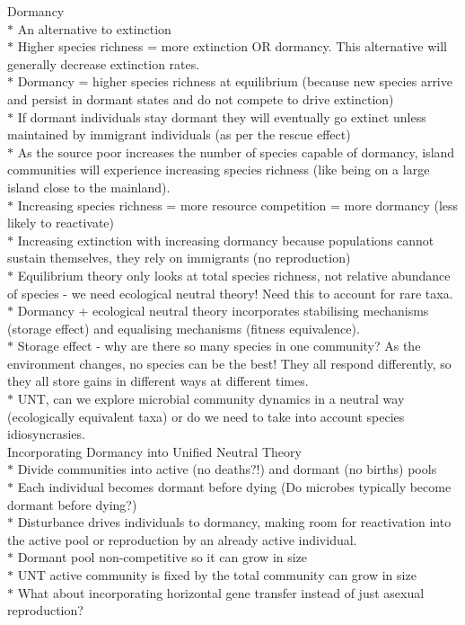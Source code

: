 \noindent Dormancy\\
{$\ast$ An alternative to extinction}\\
{$\ast$ Higher species richness = more extinction OR dormancy. This alternative will generally decrease extinction rates.}\\
{$\ast$ Dormancy = higher species richness at equilibrium (because new species arrive and persist in dormant states and do not compete to drive extinction)}\\
{$\ast$ If dormant individuals stay dormant they will eventually go extinct  unless maintained by immigrant individuals (as per the rescue effect)}\\
{$\ast$ As the source poor increases the number of species capable of dormancy, island communities will experience increasing species richness (like being on a large island close to the mainland).}\\
{$\ast$ Increasing species richness = more resource competition = more dormancy (less likely to reactivate)}\\
{$\ast$ Increasing extinction with increasing dormancy because populations cannot sustain themselves, they rely on immigrants (no reproduction)}\\
{$\ast$ Equilibrium theory only looks at total species richness, not relative abundance of species - we need ecological neutral theory! Need this to account for rare taxa. }\\
{$\ast$ Dormancy + ecological neutral theory incorporates stabilising mechanisms (storage effect) and equalising mechanisms (fitness equivalence).}\\
{$\ast$ Storage effect - why are there so many species in one community? As the environment changes, no species can be the best! They all respond differently, so they all store gains in different ways at different times.}\\
{$\ast$ UNT, can we explore microbial community dynamics in a neutral way (ecologically equivalent taxa) or do we need to take into account species idiosyncrasies. }\\

\noindent Incorporating Dormancy into Unified Neutral Theory\\
{$\ast$ Divide communities into active (no deaths?!) and dormant (no births) pools}\\
{$\ast$ Each individual becomes dormant before dying (Do microbes typically become dormant before dying?)}\\
{$\ast$ Disturbance drives individuals to dormancy, making room for reactivation into the active pool or reproduction by an already active individual. }\\
{$\ast$ Dormant pool non-competitive so it can grow in size}\\
{$\ast$ UNT active community is fixed by the total community can grow in size}\\
{$\ast$ What about incorporating horizontal gene transfer instead of just asexual reproduction?}\\

